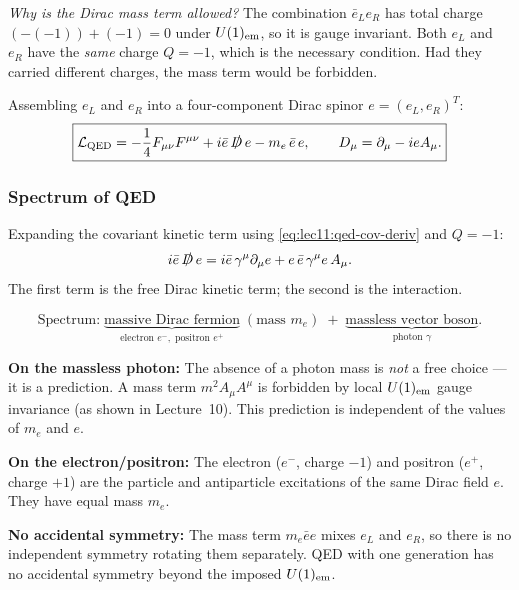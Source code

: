 \documentclass[../main.tex]{subfiles}
\begin{document}
\textit{Why is the Dirac mass term allowed?} The combination $\bar{e}_L e_R$ has total charge $(-(-1))+(-1) = 0$ under $U(1)_{\rm em}$, so it is gauge invariant.  Both $e_L$ and $e_R$ have the \emph{same} charge $Q=-1$, which is the necessary condition.  Had they carried different charges, the mass term would be forbidden.

Assembling $e_L$ and $e_R$ into a four-component Dirac spinor $e=(e_L,e_R)^T$:
\begin{equation}
  \boxed{
  \mathcal{L}_{\mathrm{QED}}
  =
  -\frac{1}{4}F_{\mu\nu}F^{\mu\nu}
  + i\bar{e}\,\slashed{D}\,e
  - m_e\,\bar{e}\,e,
  \qquad D_\mu = \partial_\mu - ie A_\mu.}
  \label{eq:lec11:qed-lagrangian}
\end{equation}

\subsubsection*{Spectrum of QED}

Expanding the covariant kinetic term using \eqref{eq:lec11:qed-cov-deriv} and $Q=-1$:
\begin{equation}
  i\bar{e}\,\slashed{D}\,e
  = i\bar{e}\,\gamma^\mu\partial_\mu e
  + e\,\bar{e}\,\gamma^\mu e\, A_\mu.
  \label{eq:lec11:qed-expand}
\end{equation}
The first term is the free Dirac kinetic term; the second is the interaction.

\begin{equation}
  \boxed{
  \text{Spectrum:}\;
  \underbrace{\text{massive Dirac fermion}}_{\text{electron }e^-,\;\text{positron }e^+}\;(\text{mass }m_e)
  \;+\;
  \underbrace{\text{massless vector boson}}_{\text{photon }\gamma}.}
  \label{eq:lec11:qed-spectrum}
\end{equation}

\textbf{On the massless photon:}  The absence of a photon mass is \emph{not} a free choice — it is a prediction.  A mass term $m^2 A_\mu A^\mu$ is forbidden by local $U(1)_{\rm em}$ gauge invariance (as shown in Lecture~10).  This prediction is independent of the values of $m_e$ and $e$.

\textbf{On the electron/positron:}  The electron ($e^-$, charge $-1$) and positron ($e^+$, charge $+1$) are the particle and antiparticle excitations of the same Dirac field $e$.  They have equal mass $m_e$.

\textbf{No accidental symmetry:}  The mass term $m_e\bar{e}e$ mixes $e_L$ and $e_R$, so there is no independent symmetry rotating them separately.  QED with one generation has no accidental symmetry beyond the imposed $U(1)_{\rm em}$.
\end{document}
